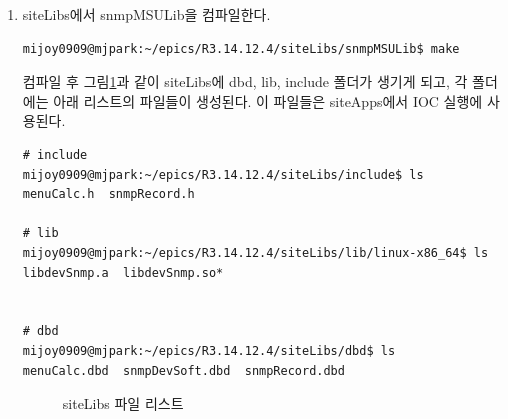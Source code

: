 \documentclass[11pt
  , a4paper
  , article
  , oneside
]{memoir}
\begin{document}
\begin{enumerate}
\item siteLibs에서 snmpMSULib을 컴파일한다.

\begin{lstlisting}[style=termstyle]
mijoy0909@mjpark:~/epics/R3.14.12.4/siteLibs/snmpMSULib$ make
\end{lstlisting}

컴파일 후 그림\ref{fig:libmake}과 같이 siteLibs에 dbd, lib, include 폴더가 생기게 되고, 각 폴더에는 아래 리스트의 파일들이 생성된다. 이 파일들은 siteApps에서 IOC 실행에 사용된다.

\begin{lstlisting}[style=termstyle]
# include
mijoy0909@mjpark:~/epics/R3.14.12.4/siteLibs/include$ ls
menuCalc.h  snmpRecord.h

# lib
mijoy0909@mjpark:~/epics/R3.14.12.4/siteLibs/lib/linux-x86_64$ ls
libdevSnmp.a  libdevSnmp.so*


# dbd
mijoy0909@mjpark:~/epics/R3.14.12.4/siteLibs/dbd$ ls
menuCalc.dbd  snmpDevSoft.dbd  snmpRecord.dbd
\end{lstlisting}

\begin{figure}[!h]
  \centering
              \hfill
              \hfill
            
  \caption
      {
        siteLibs 파일 리스트 
      }
 \label{fig:libmake}
\end{figure}


\end{enumerate}
\end{document}

